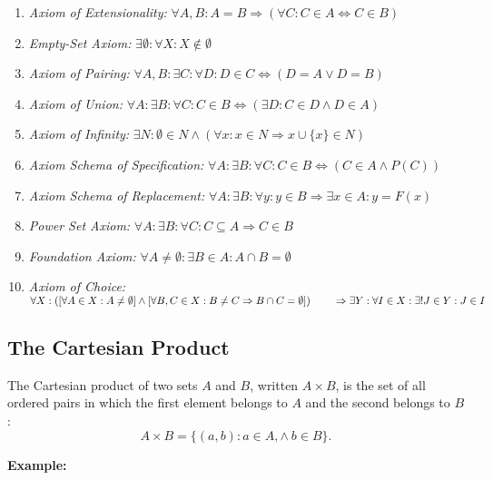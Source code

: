 \begin{enumerate}[label = \Roman*.]
	\item \emph{Axiom of Extensionality:} \quad \(\forall A, B: A = B \Rightarrow (\forall C: C \in A \Leftrightarrow C \in B)\)
	\item \emph{Empty-Set Axiom:} \quad \(\exists \emptyset : \forall X: X \notin \emptyset\)
	\item \emph{Axiom of Pairing:} \quad \(\forall A, B: \exists C: \forall D: D \in C \Leftrightarrow (D = A \lor D = B)\)
	\item \emph{Axiom of Union:} \quad \(\forall A: \exists B: \forall C: C \in B \Leftrightarrow (\exists D: C \in D \land D \in A)\)
	\item \emph{Axiom of Infinity:} \quad \(\exists N: \emptyset \in N \land (\forall x: x \in N \Rightarrow x \cup \{x\} \in N)\)
	\item \emph{Axiom Schema of Specification:} \quad \(\forall A: \exists B: \forall C: C \in B \Leftrightarrow (C \in A \land P(C))\)
	\item \emph{Axiom Schema of Replacement:} \quad \(\forall A: \exists B: \forall y: y \in B \Rightarrow \exists x \in A: y = F(x)\)
	\item \emph{Power Set Axiom:} \quad \(\forall A: \exists B: \forall C: C \subseteq A \Rightarrow C \in B\)
	\item \emph{Foundation Axiom:} \quad \(\forall A \ne \emptyset: \exists B \in A: A \cap B = \emptyset\)
	\item \emph{Axiom of Choice:} \quad \(\forall X:
		      \left( \left[ \forall A \in X: A \ne \emptyset \right] \land
		      \left[ \forall B, C \in X: B \ne C \Rightarrow B \cap C = \emptyset \right] \right) \\
		      \qquad \Rightarrow \exists Y: \forall I \in X: \exists! J \in Y: J \in I\)
\end{enumerate}

\subsection{The Cartesian Product}

The Cartesian product of two sets \(A\) and \(B\), written \(A \times B\), is the set of all ordered pairs in which the first element belongs to \(A\) and the second belongs to \(B\):
\[A \times B = \{ (a, b) : a \in A, \land\ b \in B\}.\]

\textbf{Example:}
\vspace{\baselineskip}

